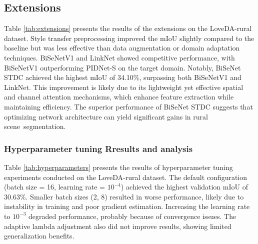 \documentclass{article}
\begin{document}
	\begin{multicols}{2}

		\subsection{Extensions}
		\justifying
		Table \ref{tab:extensions} presents the results of the extensions on the LoveDA-rural dataset. Style transfer preprocessing improved the mIoU slightly compared to the baseline but was less effective than data augmentation or domain adaptation techniques. BiSeNetV1 and LinkNet showed competitive performance, with BiSeNetV1 outperforming PIDNet-S on the target domain.
		Notably, BiSeNet STDC achieved the highest mIoU of 34.10\%, surpassing both BiSeNetV1 and LinkNet. This improvement is likely due to its lightweight yet effective spatial and channel attention mechanisms, which enhance feature extraction while maintaining efficiency. The superior performance of BiSeNet STDC suggests that optimizing network architecture can yield significant gains in rural scene segmentation.
		

		\begin{table}[H]
			\centering
			\renewcommand{\arraystretch}{1.2} %
			\setlength{\tabcolsep}{14pt} %
			
			\caption{Performance comparison of different models on rural images.}
			\label{tab:extensions}

		\end{table}


        \subsubsection{Hyperparameter tuning Rresults and analysis}
        \justifying
        Table \ref{tab:hyperparameters} presents the results of hyperparameter tuning experiments conducted on the LoveDA-rural dataset. The default configuration (batch size = 16, learning rate = \(10^{-4}\)) achieved the highest validation mIoU of 30.63\%. Smaller batch sizes (2, 8) resulted in worse performance, likely due to instability in training and poor gradient estimation. Increasing the learning rate to \(10^{-3}\) degraded performance, probably because of convergence issues. The adaptive lambda adjustment also did not improve results, showing limited generalization benefits.
        



\end{multicols}
\end{document}
